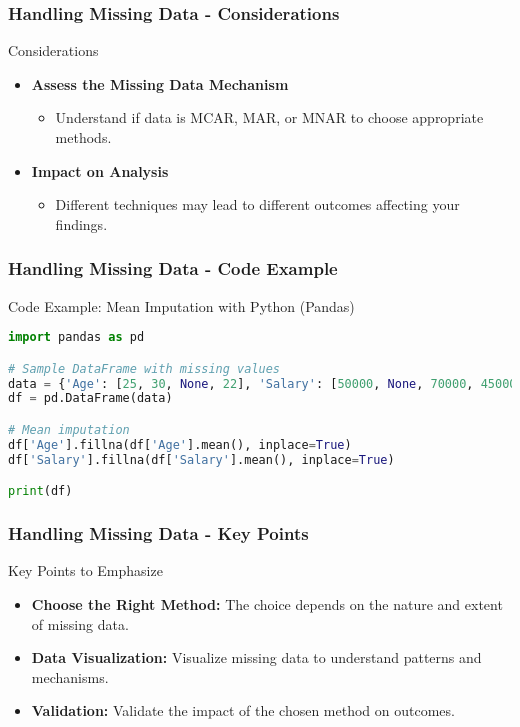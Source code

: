 \documentclass{beamer}
\begin{document}
\begin{frame}[fragile]
    \frametitle{Handling Missing Data - Considerations}
    \begin{block}{Considerations}
        \begin{itemize}
            \item \textbf{Assess the Missing Data Mechanism} 
            \begin{itemize}
                \item Understand if data is MCAR, MAR, or MNAR to choose appropriate methods.
            \end{itemize}
            \item \textbf{Impact on Analysis}
            \begin{itemize}
                \item Different techniques may lead to different outcomes affecting your findings.
            \end{itemize}
        \end{itemize}
    \end{block}
\end{frame}

\begin{frame}[fragile]
    \frametitle{Handling Missing Data - Code Example}
    \begin{block}{Code Example: Mean Imputation with Python (Pandas)}
        \begin{lstlisting}[language=Python]
import pandas as pd

# Sample DataFrame with missing values
data = {'Age': [25, 30, None, 22], 'Salary': [50000, None, 70000, 45000]}
df = pd.DataFrame(data)

# Mean imputation
df['Age'].fillna(df['Age'].mean(), inplace=True)
df['Salary'].fillna(df['Salary'].mean(), inplace=True)

print(df)
        \end{lstlisting}
    \end{block}
\end{frame}

\begin{frame}[fragile]
    \frametitle{Handling Missing Data - Key Points}
    \begin{block}{Key Points to Emphasize}
        \begin{itemize}
            \item \textbf{Choose the Right Method:} The choice depends on the nature and extent of missing data.
            \item \textbf{Data Visualization:} Visualize missing data to understand patterns and mechanisms.
            \item \textbf{Validation:} Validate the impact of the chosen method on outcomes.
        \end{itemize}
    \end{block}
\end{frame}
\end{document}
